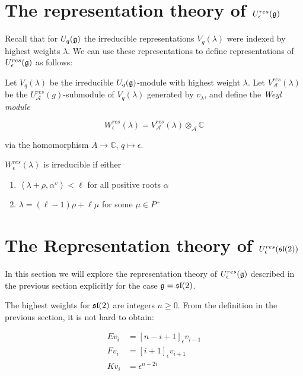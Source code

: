 \section{The representation theory of $U_\epsilon^{res}(\mathfrak{g})$}

Recall that for $U_q(\mathfrak{g})$ the irreducible representations $V_q(\lambda)$
were indexed by highest weights $\lambda$. We can use these representations to
define representations of $U_\epsilon^{res}(\mathfrak{g})$ as follows:


Let $V_q(\lambda)$ be the irreducible $U_q(\mathfrak{g})$-module with highest weight
$\lambda$. Let $V_\mathcal{A}^{res}(\lambda)$ be the
$U_\mathcal{A}^{res}(g)$-submodule of $V_q(\lambda)$ generated by $v_\lambda$,
and define the \emph{Weyl module}

\begin{equation}
    W_\epsilon^{res}(\lambda) = V_\mathcal{A}^{res}(\lambda) \otimes_\mathcal{A} \mathbb{C}
\end{equation}

via the homomorphism $A \to \mathbb{C}$, $q \mapsto \epsilon$.

\begin{claim}
    $W_\epsilon^{res}(\lambda)$ is irreducible if either 
    \begin{enumerate}
        \item $\left< \lambda + \rho, \alpha^v\right> < \ell$ for all positive
            roots $\alpha$
        \item $\lambda = (\ell - 1) \rho + \ell \mu$ for some $\mu \in P^+$
    \end{enumerate}
\end{claim}

\section{The Representation theory of $U_\epsilon^{res}(\mathfrak{sl}(2))$}

In this section we will explore the representation theory of
$U_\epsilon^{res}(\mathfrak{g})$ described in the previous section explicitly for the
case $\mathfrak{g} = \mathfrak{sl}(2)$.

The highest weights for $\mathfrak{sl}(2)$ are integers $n \geq 0$. From the definition
in the previous section, it is not hard to obtain:

\begin{align}
    Ev_i &= [n-i+1]_\epsilon v_{i-1} \\
    Fv_i &= [i+1]_\epsilon v_{i+1} \\
    Kv_i &= \epsilon^{n-2i}
\end{align}
